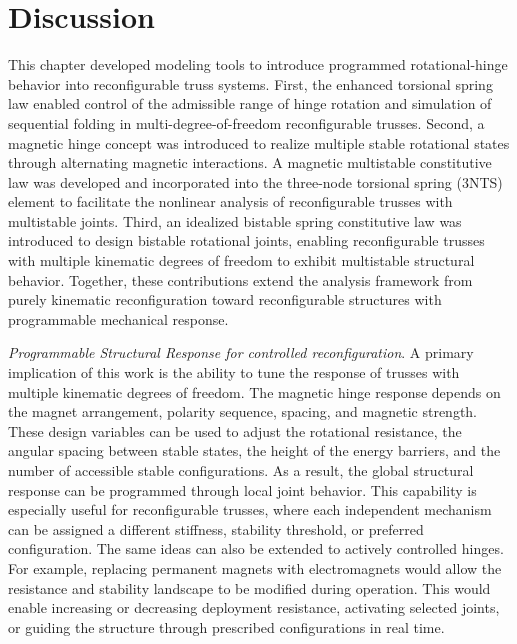 \section{Discussion}\label{04-sec-discussion}
This chapter developed modeling tools to introduce programmed rotational-hinge behavior into reconfigurable truss systems. First, the enhanced torsional spring law enabled control of the admissible range of hinge rotation and simulation of sequential folding in multi-degree-of-freedom reconfigurable trusses. Second, a magnetic hinge concept was introduced to realize multiple stable rotational states through alternating magnetic interactions. A magnetic multistable constitutive law was developed and incorporated into the three-node torsional spring (3NTS) element to facilitate the nonlinear analysis of reconfigurable trusses with multistable joints. Third, an idealized bistable spring constitutive law was introduced to design bistable rotational joints, enabling reconfigurable trusses with multiple kinematic degrees of freedom to exhibit multistable structural behavior. Together, these contributions extend the analysis framework from purely kinematic reconfiguration toward reconfigurable structures with programmable mechanical response.

\textit{Programmable Structural Response for controlled reconfiguration}. A primary implication of this work is the ability to tune the response of trusses with multiple kinematic degrees of freedom. The magnetic hinge response depends on the magnet arrangement, polarity sequence, spacing, and magnetic strength. These design variables can be used to adjust the rotational resistance, the angular spacing between stable states, the height of the energy barriers, and the number of accessible stable configurations. As a result, the global structural response can be programmed through local joint behavior. This capability is especially useful for reconfigurable trusses, where each independent mechanism can be assigned a different stiffness, stability threshold, or preferred configuration. The same ideas can also be extended to actively controlled hinges. For example, replacing permanent magnets with electromagnets would allow the resistance and stability landscape to be modified during operation. This would enable increasing or decreasing deployment resistance, activating selected joints, or guiding the structure through prescribed configurations in real time.

